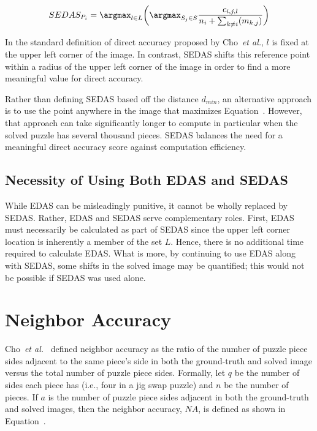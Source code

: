 \begin{equation} \label{eq:shiftableEnhancedDirectAccuracyScore}
SEDAS_{P_i} = \argmax_{l \in L} \bigg( \argmax_{S_j \in S}\frac{c_{i,j,l}}{n_i + \sum_{k \ne i}(m_{k,j})} \bigg)
\end{equation}

\noindent
In the standard definition of direct accuracy proposed by Cho~\textit{et al.}, $l$ is fixed at the upper left corner of the image.  In contrast, SEDAS shifts this reference point within a radius of the upper left corner of the image in order to find a more meaningful value for direct accuracy. 

Rather than defining SEDAS based off the distance $d_{min}$, an alternative approach is to use the point anywhere in the image that maximizes Equation~.  However, that approach can take significantly longer to compute in particular when the solved puzzle has several thousand pieces.  SEDAS balances the need for a meaningful direct accuracy score against computation efficiency.

\subsection{Necessity of Using Both EDAS and SEDAS}\label{sec:importanceEdasSedas}

While EDAS can be misleadingly punitive, it cannot be wholly replaced by SEDAS.  Rather, EDAS and SEDAS serve complementary roles.  First, EDAS must necessarily be calculated as part of SEDAS since the upper left corner location is inherently a member of the set $L$.  Hence, there is no additional time required to calculate EDAS.  What is more, by continuing to use EDAS along with SEDAS, some shifts in the solved image may be quantified; this would not be possible if SEDAS was used alone.

\section{Neighbor Accuracy}\label{sec:neighborAccuracy}

Cho~\textit{et al.}~\cite{cho2010} defined neighbor accuracy as the ratio of the number of puzzle piece sides adjacent to the same piece's side in both the ground-truth and solved image versus the total number of puzzle piece sides.  Formally, let $q$ be the number of sides each piece has (i.e., four in a jig swap puzzle) and $n$ be the number of pieces.  If $a$ is the number of puzzle piece sides adjacent in both the ground-truth and solved images, then the neighbor accuracy, $NA$, is defined as shown in Equation~.

